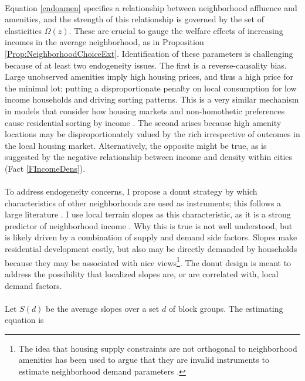 \documentclass[12pt]{article}
\begin{document}
\paragraph*{}
Equation \eqref{endoamen} specifies a relationship between neighborhood affluence and amenities, and the strength of this relationship is governed by the set of elasticities $\Omega(z)$. These are crucial to gauge the welfare effects of increasing incomes in the average neighborhood, as in Proposition \ref{Prop:NeighborhoodChoiceExt}. Identification of these parameters is challenging because of at least two endogeneity issues. The first is a reverse-causality bias. Large unobserved amenities imply high housing prices, and thus a high price for the minimal lot; putting a disproportionate penalty on local consumption for low income households and driving sorting patterns. This is a very similar mechanism in models that consider how housing markets and non-homothetic preferences cause residential sorting by income \citep{LeeandLin, Coutureetal}. The second arises because high amenity locations may be disproportionately valued by the rich irrespective of outcomes in the local housing market. Alternatively, the opposite might be true, as is suggested by the negative relationship between income and density within cities (Fact \ref{FIncomeDens}). 

\paragraph*{}
To address endogeneity concerns, I propose a donut strategy by which characteristics of other neighborhoods are used as instruments; this follows a large literature \citep{BFMJPE, anagoletal2021, AmalgroetalChicagoDemos}. I use local terrain slopes as this characteristic, as it is a strong predictor of neighborhood income \citep{LeeandLin, saiz2010}. Why this is true is not well understood, but is likely driven by a combination of supply and demand side factors. Slopes make residential development costly, but also may be directly demanded by households because they may be associated with nice views\footnote{The idea that housing supply constraints are not orthogonal to neighborhood amenities has been used to argue that they are invalid instruments to estimate neighborhood demand parameters \citep{davidoffcritique}.}. The donut design is meant to address the possibility that localized slopes are, or are correlated with, local demand factors.

\paragraph*{}
 Let $S(d)$ be the average slopes over a set $d$ of block groups. The estimating equation is 
\end{document}
